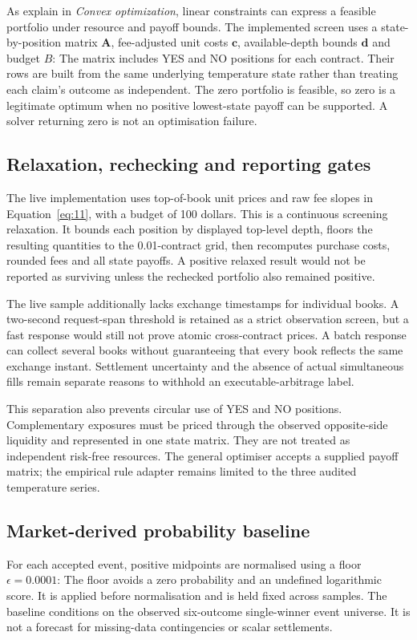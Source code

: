 As  explain in \textit{Convex optimization}, linear constraints can express a feasible portfolio under resource and payoff bounds. The implemented screen uses a state-by-position matrix $\mathbf A$, fee-adjusted unit costs $\mathbf c$, available-depth bounds $\mathbf d$ and budget $B$:
The matrix includes YES and NO positions for each contract. Their rows are built from the same underlying temperature state rather than treating each claim's outcome as independent. The zero portfolio is feasible, so zero is a legitimate optimum when no positive lowest-state payoff can be supported. A solver returning zero is not an optimisation failure.

\subsection{Relaxation, rechecking and reporting gates}
The live implementation uses top-of-book unit prices and raw fee slopes in Equation~\ref{eq:11}, with a budget of 100 dollars. This is a continuous screening relaxation. It bounds each position by displayed top-level depth, floors the resulting quantities to the 0.01-contract grid, then recomputes purchase costs, rounded fees and all state payoffs. A positive relaxed result would not be reported as surviving unless the rechecked portfolio also remained positive.

The live sample additionally lacks exchange timestamps for individual books. A two-second request-span threshold is retained as a strict observation screen, but a fast response would still not prove atomic cross-contract prices. A batch response can collect several books without guaranteeing that every book reflects the same exchange instant. Settlement uncertainty and the absence of actual simultaneous fills remain separate reasons to withhold an executable-arbitrage label.

This separation also prevents circular use of YES and NO positions. Complementary exposures must be priced through the observed opposite-side liquidity and represented in one state matrix. They are not treated as independent risk-free resources. The general optimiser accepts a supplied payoff matrix; the empirical rule adapter remains limited to the three audited temperature series.

\label{sec:probability}
\subsection{Market-derived probability baseline}
For each accepted event, positive midpoints are normalised using a floor $\epsilon=0.0001$:
The floor avoids a zero probability and an undefined logarithmic score. It is applied before normalisation and is held fixed across samples. The baseline conditions on the observed six-outcome single-winner event universe. It is not a forecast for missing-data contingencies or scalar settlements.

